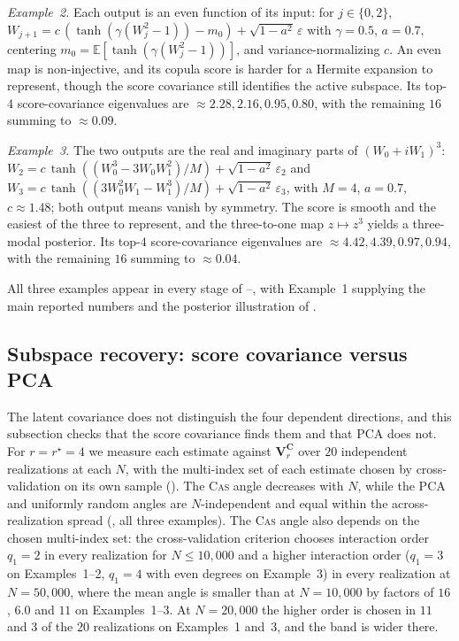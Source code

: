 \documentclass[review,hidelinks,onefignum,onetabnum]{siamart251216}
\newcommand{\EE}{\mathbb{E}}
\newcommand{\mC}{\bm{C}}
\newcommand{\mV}{\bm{V}}
\begin{document}
\emph{Example~2.} Each output is an even function of its input: for $j \in \{0, 2\}$, $W_{j+1} = c\,(\tanh(\gamma(W_j^2 - 1)) - m_0) + \sqrt{1 - a^2}\,\varepsilon$ with $\gamma = 0.5$, $a = 0.7$, centering $m_0 = \EE[\tanh(\gamma(W_j^2 - 1))]$, and variance-normalizing $c$. An even map is non-injective, and its copula score is harder for a Hermite expansion to represent, though the score covariance still identifies the active subspace. Its top-$4$ score-covariance eigenvalues are $\approx 2.28, 2.16, 0.95, 0.80$, with the remaining $16$ summing to $\approx 0.09$.

\emph{Example~3.} The two outputs are the real and imaginary parts of $(W_0 + iW_1)^3$: $W_2 = c\,\tanh((W_0^3 - 3 W_0 W_1^2)/M) + \sqrt{1 - a^2}\,\varepsilon_2$ and $W_3 = c\,\tanh((3 W_0^2 W_1 - W_1^3)/M) + \sqrt{1 - a^2}\,\varepsilon_3$, with $M = 4$, $a = 0.7$, $c \approx 1.48$; both output means vanish by symmetry. The score is smooth and the easiest of the three to represent, and the three-to-one map $z \mapsto z^3$ yields a three-modal posterior. Its top-$4$ score-covariance eigenvalues are $\approx 4.42, 4.39, 0.97, 0.94$, with the remaining $16$ summing to $\approx 0.04$.

All three examples appear in every stage of --, with Example~1 supplying the main reported numbers and the posterior illustration of .

\subsection{Subspace recovery: score covariance versus PCA}
\label{sec:exp-banana}

The latent covariance does not distinguish the four dependent directions, and this subsection checks that the score covariance finds them and that PCA does not. For $r = r^\star = 4$ we measure each estimate against $\mV_r^{\mC}$ over $20$ independent realizations at each $N$, with the multi-index set of each estimate chosen by cross-validation on its own sample (). The \textsc{Cas} angle decreases with $N$, while the PCA and uniformly random angles are $N$-independent and equal within the across-realization spread (, all three examples). The \textsc{Cas} angle also depends on the chosen multi-index set: the cross-validation criterion chooses interaction order $q_1 = 2$ in every realization for $N \le 10{,}000$ and a higher interaction order ($q_1 = 3$ on Examples~1--2, $q_1 = 4$ with even degrees on Example~3) in every realization at $N = 50{,}000$, where the mean angle is smaller than at $N = 10{,}000$ by factors of $16$, $6.0$ and $11$ on Examples~1--3. At $N = 20{,}000$ the higher order is chosen in $11$ and $3$ of the $20$ realizations on Examples~1 and~3, and the band is wider there.
\end{document}
